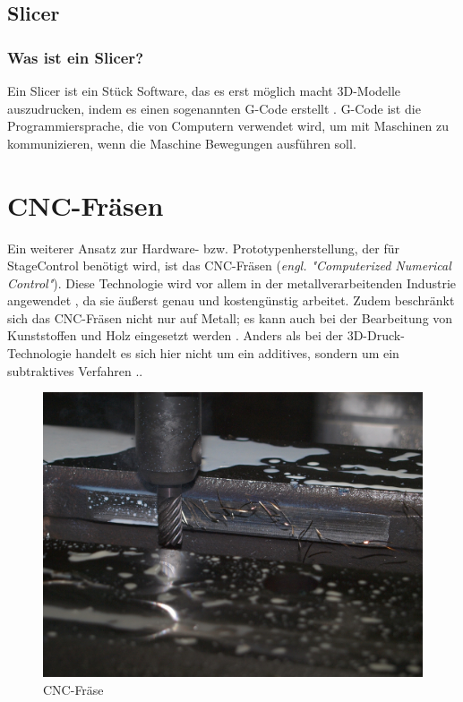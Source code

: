 \subsection{Slicer}
\subsubsection{Was ist ein Slicer?}
Ein Slicer ist ein Stück Software, das es erst möglich macht 3D-Modelle auszudrucken, indem es einen sogenannten G-Code erstellt \textcite{SlicerGCode}. G-Code ist die Programmiersprache, die von Computern verwendet wird, um mit Maschinen zu kommunizieren, wenn die Maschine Bewegungen ausführen soll. \\



\section{CNC-Fräsen}

Ein weiterer Ansatz zur Hardware- bzw. Prototypenherstellung, der für StageControl benötigt wird, ist das CNC-Fräsen (\emph{engl. "Computerized Numerical Control"}). Diese Technologie wird vor allem in der metallverarbeitenden Industrie angewendet \textcite{CNCFraesen}, da sie äußerst genau und kostengünstig arbeitet. Zudem beschränkt sich das CNC-Fräsen nicht nur auf Metall; es kann auch bei der Bearbeitung von Kunststoffen und Holz eingesetzt werden \textcite{CNCFraesen2}. Anders als bei der 3D-Druck-Technologie handelt es sich hier nicht um ein additives, sondern um ein subtraktives Verfahren  \textcite{CNCFraesen3}..\\  


\begin{figure}[H]
	\centering
	\includegraphics[width=0.8\linewidth]{images/CNC.jpg}
	\caption[CNC-Fräse]{CNC-Fräse}
	\label{fig:cnc-fraese}
\end{figure}

